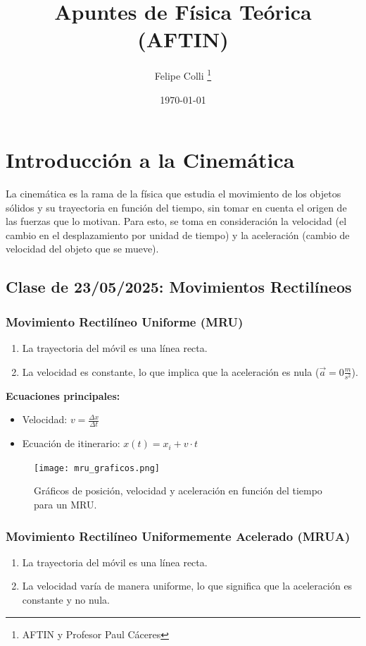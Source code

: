 \documentclass[11pt]{article}
\title{Apuntes de Física Teórica (AFTIN)}
\author{Felipe Colli \thanks{AFTIN y Profesor Paul Cáceres}}
\date{\today}
\begin{document}
\maketitle
\tableofcontents
\newpage

\section{Introducción a la Cinemática}
La cinemática es la rama de la física que estudia el movimiento de los objetos sólidos y su trayectoria en función del tiempo, sin tomar en cuenta el origen de las fuerzas que lo motivan. Para esto, se toma en consideración la velocidad (el cambio en el desplazamiento por unidad de tiempo) y la aceleración (cambio de velocidad del objeto que se mueve).

\subsection{Clase de 23/05/2025: Movimientos Rectilíneos}
\subsubsection{Movimiento Rectilíneo Uniforme (MRU)}
\begin{enumerate}
	\item La trayectoria del móvil es una línea recta.
	\item La velocidad es constante, lo que implica que la aceleración es nula ($\vec{a}=0 \frac{m}{s^2}$).
\end{enumerate}

\textbf{Ecuaciones principales:}
\begin{itemize}
	\item Velocidad: $v = \frac{\Delta x}{\Delta t}$
	\item Ecuación de itinerario: $x(t) = x_i + v \cdot t$
\end{itemize}

\begin{figure}[h!]
	\centering
	\texttt{[image: mru\_graficos.png]}
	\caption{Gráficos de posición, velocidad y aceleración en función del tiempo para un MRU.}
\end{figure}

\subsubsection{Movimiento Rectilíneo Uniformemente Acelerado (MRUA)}
\begin{enumerate}
	\item La trayectoria del móvil es una línea recta.
	\item La velocidad varía de manera uniforme, lo que significa que la aceleración es constante y no nula.
\end{enumerate}
\end{document}
